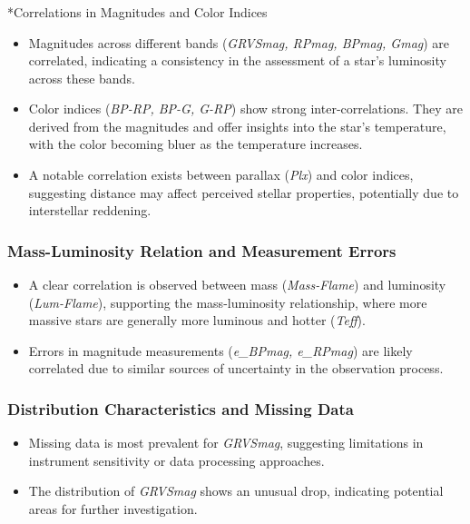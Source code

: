 \subsubsection{}*{Correlations in Magnitudes and Color Indices}
\begin{itemize}
  \item Magnitudes across different bands (\textit{GRVSmag, RPmag, BPmag, Gmag}) are correlated, indicating a consistency in the assessment of a star's luminosity across these bands.
  \item Color indices (\textit{BP-RP, BP-G, G-RP}) show strong inter-correlations. They are derived from the magnitudes and offer insights into the star's temperature, with the color becoming bluer as the temperature increases.
  \item A notable correlation exists between parallax (\textit{Plx}) and color indices, suggesting distance may affect perceived stellar properties, potentially due to interstellar reddening.
\end{itemize}

\subsubsection*{Mass-Luminosity Relation and Measurement Errors}

\begin{itemize}
  \item A clear correlation is observed between mass (\textit{Mass-Flame}) and luminosity (\textit{Lum-Flame}), supporting the mass-luminosity relationship, where more massive stars are generally more luminous and hotter (\textit{Teff}).
  \item Errors in magnitude measurements (\textit{e\_BPmag, e\_RPmag}) are likely correlated due to similar sources of uncertainty in the observation process.
\end{itemize}

\subsubsection*{Distribution Characteristics and Missing Data}

\begin{itemize}
  \item Missing data is most prevalent for \textit{GRVSmag}, suggesting limitations in instrument sensitivity or data processing approaches.
  \item The distribution of \textit{GRVSmag} shows an unusual drop, indicating potential areas for further investigation.
\end{itemize}

